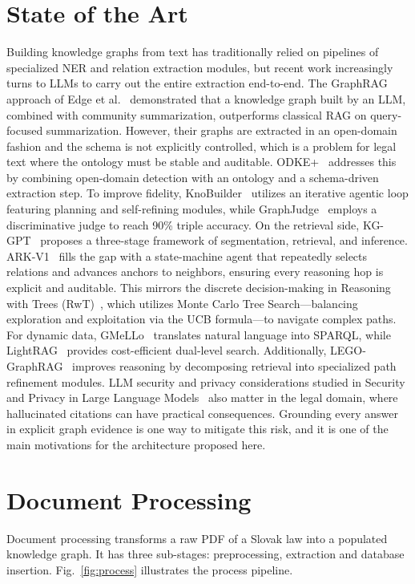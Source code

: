 \documentclass[conference]{IEEEtran}
\begin{document}
\section{State of the Art}
Building knowledge graphs from text has traditionally relied on pipelines of specialized NER and relation extraction modules, but recent work increasingly turns to LLMs to carry out the entire extraction end-to-end. The GraphRAG approach of {Edge et al.}~\cite{2} demonstrated that a knowledge graph built by an LLM, combined with community summarization, outperforms classical RAG on query-focused summarization. However, their graphs are extracted in an open-domain fashion and the schema is not explicitly controlled, which is a problem for legal text where the ontology must be stable and auditable. ODKE+~\cite{odkeplus2025} addresses this by combining open-domain detection with an ontology and a schema-driven extraction step. To improve fidelity, KnoBuilder~\cite{3} utilizes an iterative agentic loop featuring planning and self-refining modules, while GraphJudge~\cite{4} employs a discriminative judge to reach 90\% triple accuracy. On the retrieval side, KG-GPT~\cite{kggpt2023} proposes a three-stage framework of segmentation, retrieval, and inference. ARK-V1~\cite{arkv12025} fills the gap with a state-machine agent that repeatedly selects relations and advances anchors to neighbors, ensuring every reasoning hop is explicit and auditable. This mirrors the discrete decision-making in {Reasoning with Trees (RwT)}~\cite{7}, which utilizes Monte Carlo Tree Search—balancing exploration and exploitation via the UCB formula—to navigate complex paths. For dynamic data, GMeLLo~\cite{11} translates natural language into SPARQL, while LightRAG~\cite{12} provides cost-efficient dual-level search. Additionally, LEGO-GraphRAG~\cite{13} improves reasoning by decomposing retrieval into specialized path refinement modules. LLM security and privacy considerations studied in {Security and Privacy in Large Language Models}~\cite{1} also matter in the legal domain, where hallucinated citations can have practical consequences. Grounding every answer in explicit graph evidence is one way to mitigate this risk, and it is one of the main motivations for the architecture proposed here.

\section{Document Processing}

Document processing transforms a raw PDF of a Slovak law into a populated knowledge graph. It has three sub-stages: preprocessing, extraction and database insertion. Fig.~\ref{fig:process} illustrates the process pipeline.
\end{document}
